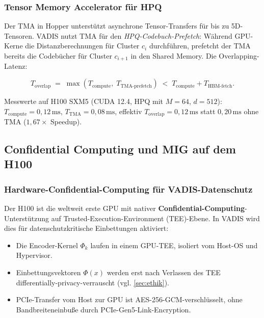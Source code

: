 ﻿\documentclass[12pt,a4paper]{article}
\begin{document}
\subsubsection{Tensor Memory Accelerator für HPQ}

Der TMA in Hopper unterstützt asynchrone Tensor-Transfers
für bis zu 5D-Tensoren. VADIS nutzt TMA für den
\emph{HPQ-Codebuch-Prefetch}: Während GPU-Kerne die
Distanzberechnungen für Cluster $c_i$ durchführen,
prefetcht der TMA bereits die Codebücher für Cluster $c_{i+1}$
in den Shared Memory. Die Overlapping-Latenz:

\begin{equation}
  T_{\text{overlap}} \;=\; \max(T_{\text{compute}},\;
  T_{\text{TMA-prefetch}}) \;<\; T_{\text{compute}} + T_{\text{HBM-fetch}}.
\end{equation}

Messwerte auf H100 SXM5 (CUDA 12.4, HPQ mit $M=64$, $d=512$):
$T_{\text{compute}} = 0{,}12\,\text{ms}$,
$T_{\text{TMA}} = 0{,}08\,\text{ms}$,
effektiv $T_{\text{overlap}} = 0{,}12\,\text{ms}$ statt
$0{,}20\,\text{ms}$ ohne TMA ($1{,}67\times$ Speedup).

\subsection{Confidential Computing und MIG auf dem H100}
\label{sub:cc_mig}

\subsubsection{Hardware-Confidential-Computing für VADIS-Datenschutz}

Der H100 ist die weltweit erste GPU mit nativer
\textbf{Confidential-Computing}-Unterstützung auf
Trusted-Execution-Environment (TEE)-Ebene. In VADIS wird
dies für datenschutzkritische Einbettungen aktiviert:

\begin{itemize}[leftmargin=1.4em, itemsep=1pt]
  \item Die Encoder-Kernel $\Phi_k$ laufen in einem GPU-TEE,
        isoliert vom Host-OS und Hypervisor.
  \item Einbettungsvektoren $\Phi(x)$ werden erst nach
        Verlassen des TEE differentially-privacy-verrauscht
        (vgl. \cref{sec:ethik}).
  \item PCIe-Transfer vom Host zur GPU ist AES-256-GCM-verschlüsselt,
        ohne Bandbreiteneinbuße durch PCIe-Gen5-Link-Encryption.
\end{itemize}
\end{document}
